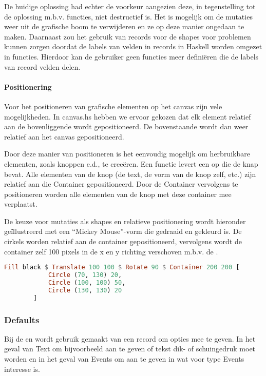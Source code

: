 De huidige oplossing had echter de voorkeur aangezien deze, in tegenstelling tot de oplossing m.b.v. functies, niet destructief is. Het is mogelijk om de mutaties weer uit de grafische boom te verwijderen en ze op deze manier ongedaan te maken. Daarnaast zou het gebruik van records voor de shapes voor problemen kunnen zorgen doordat de labels van velden in records in Haskell worden omgezet in functies. Hierdoor kan de gebruiker geen functies meer defini\"eren die de labels van record velden delen.

\paragraph{Positionering}
Voor het positioneren van grafische elementen op het canvas zijn vele mogelijkheden. In canvas.hs hebben we ervoor gekozen dat elk element relatief aan de bovenliggende  wordt gepositioneerd. De bovenstaande  wordt dan weer relatief aan het canvas gepositioneerd. 

Door deze manier van positioneren is het eenvoudig mogelijk om herbruikbare elementen, zoals knoppen e.d., te creeëren. Een functie levert een  op die de knap bevat. Alle elementen van de knop (de text, de vorm van de knop zelf, etc.) zijn relatief aan die Container gepositioneerd. Door de Container vervolgens te positioneren worden alle elementen van de knop met deze container mee verplaatst. 

De keuze voor mutaties als shapes en relatieve positionering wordt hieronder geïllustreerd met een ``Mickey Mouse''-vorm die gedraaid en gekleurd is. De cirkels worden relatief aan de container gepositioneerd, vervolgens wordt de container zelf 100 pixels in de x en y richting verschoven m.b.v. de . 

\begin{lstlisting}[style=densecode, language=Haskell]
Fill black $ Translate 100 100 $ Rotate 90 $ Container 200 200 [
            Circle (70, 130) 20,
            Circle (100, 100) 50,
            Circle (130, 130) 20 
        ]
\end{lstlisting}

\subsubsection{Defaults}
Bij de  en  wordt gebruik gemaakt van een record om opties mee te geven. In het geval van Text om bijvoorbeeld aan te geven of tekst dik- of schuingedruk moet worden en in het geval van Events om aan te geven in wat voor type Events interesse is. 

